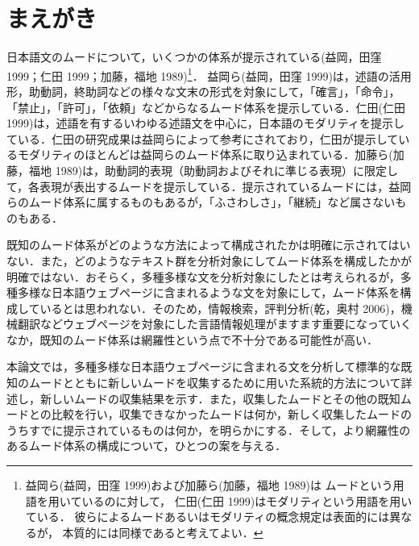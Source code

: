 \documentclass[japanese]{jnlp_1.4}
\begin{document}
\maketitle


\section{まえがき}

日本語文のムードについて，いくつかの体系が提示されている(益岡，田窪 
1999；仁田 1999；加藤，福地 1989)\footnote{
	益岡ら(益岡，田窪 1999)および加藤ら(加藤，福地 1989)は
	ムードという用語を用いているのに対して，
	仁田(仁田 1999)はモダリティという用語を用いている．
	彼らによるムードあるいはモダリティの概念規定は表面的には異なるが，
	本質的には同様であると考えてよい．}．
益岡ら(益岡，田窪 1999)は，述語の活用形，助動詞，終助詞などの様々な文末の形式を対象にして，「確言」，「命令」，「禁止」，「許可」，「依頼」などからなるムード体系を提示している．仁田(仁田 
1999)は，述語を有するいわゆる述語文を中心に，日本語のモダリティを提示している．仁田の研究成果は益岡らによって参考にされており，仁田が提示しているモダリティのほとんどは益岡らのムード体系に取り込まれている．加藤ら(加藤，福地 1989)は，助動詞的表現（助動詞およびそれに準じる表現）に限定して，各表現が表出するムードを提示している．提示されているムードには，益岡らのムード体系に属するものもあるが，「ふさわしさ」，「継続」など属さないものもある．

既知のムード体系がどのような方法によって構成されたかは明確に示されてはいない．また，どのようなテキスト群を分析対象にしてムード体系を構成したかが明確ではない．おそらく，多種多様な文を分析対象にしたとは考えられるが，多種多様な日本語ウェブページに含まれるような文を対象にして，ムード体系を構成しているとは思われない．そのため，情報検索，評判分析(乾，奥村 
2006)，機械翻訳などウェブページを対象にした言語情報処理がますます重要になっていくなか，既知のムード体系は網羅性という点で不十分である可能性が高い．

本論文では，多種多様な日本語ウェブページに含まれる文を分析して標準的な既知のムードとともに新しいムードを収集するために用いた系統的方法について詳述し，新しいムードの収集結果を示す．また，収集したムードとその他の既知ムードとの比較を行い，収集できなかったムードは何か，新しく収集したムードのうちすでに提示されているものは何か，を明らかにする．そして，より網羅性のあるムード体系の構成について，ひとつの案を与える．
\end{document}
